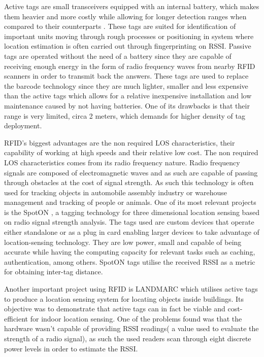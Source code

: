   
Active tags are small transceivers equipped with an internal battery, which makes them heavier and more costly while allowing for longer detection ranges when compared to their counterparts \cite{surveythesis}. These tags are suited for identification of important units moving through rough processes or positioning in system where location estimation is often carried out through fingerprinting on \ac{RSSI}.  
Passive tags are operated without the need of a battery since they are capable of receiving enough energy in the form of radio frequency waves from nearby \ac{RFID} scanners in order to transmit back the answers. These tags are used to replace the barcode technology since they are much lighter, smaller and less expensive than the active tags which allows for a relative inexpensive installation and low maintenance caused by not having batteries. One of its drawbacks is that their range is very limited, circa 2 meters, which demands for higher density of tag deployment.  
  
  
\ac{RFID}'s biggest advantages are the non required \ac{LOS} characteristics, their capability of working at high speeds and their relative low cost\cite{survey2}. The non required \ac{LOS} characteristics comes from its radio frequency nature. Radio frequency signals are composed of electromagnetic waves and as such are capable of passing through obstacles at the cost of signal strength. As such this technology is often used for tracking objects in automobile assembly industry or warehouse management and tracking of people or animals.  
One of its most relevant projects is the SpotON \cite{spoton}, a tagging technology for three dimensional location sensing based on radio signal strength analysis. The tags used are custom devices that operate either standalone or as a plug in card enabling larger devices to take advantage of location-sensing technology. They are low power, small and capable of being accurate while having the computing capacity for relevant tasks such as caching, authentication, among others. SpotON tags utilise the received \ac{RSSI} as a metric for obtaining inter-tag distance.  
  
  
Another important project using \ac{RFID} is LANDMARC\cite{landmarc} which utilises active tags to produce a location sensing system for locating objects inside buildings. Its objective was to demonstrate that active tags can in fact be viable and cost-efficient for indoor location sensing. One of the problems found was that the hardware wasn't capable of providing \acf{RSSI} readings( a value used to evaluate the strength of a radio signal), as such the used readers scan through eight discrete power levels in order to estimate the \ac{RSSI}.   
  
